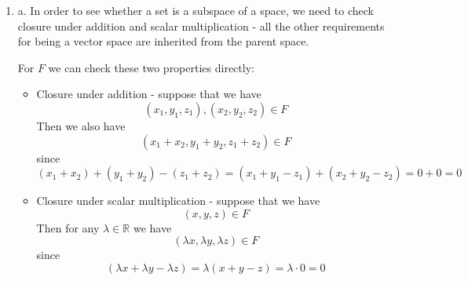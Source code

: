 \documentclass{article}
\newcommand{\chapternumber}{2}
\newenvironment{QandA}{\begin{enumerate}[label=\chapternumber.\arabic*]\bfseries\boldmath}
	{\end{enumerate}}
\newenvironment{answered}{\par\bigskip\normalfont\unboldmath}{}
\begin{document}
\begin{QandA}
\begin{answered}
			c. We note that 
			\[\begin{pmatrix}
				3 \\ 1 \\ 7 \\ 3
			\end{pmatrix}\]
			lies in $U_1$ but that
			\[\begin{pmatrix}
				-3 \\ 2 \\ -5 \\ -1
			\end{pmatrix}\]
			does not. Therefore the dimension of $U_1\cap U_2$ is at least 1 but less than 2, since it does not contain all of $U_2$. Therefore the dimension is exactly 1 and we can write our basis of $U_1\cap U_2$ as
			\[\left\{
			\begin{pmatrix}
				3 \\ 1 \\ 7 \\ 3
			\end{pmatrix}
			\right\}\]
		\end{answered}
		
		\item 
		\begin{answered}
			a. In order to see whether a set is a subspace of a space, we need to check closure under addition and scalar multiplication - all the other requirements for being a vector space are inherited from the parent space.
			
			For $F$ we can check these two properties directly:
			\begin{itemize}
				\item Closure under addition - suppose that we have
				\[(x_1,y_1,z_1),(x_2,y_2,z_2)\in F\]
				Then we also have
				\[(x_1+x_2,y_1+y_2,z_1+z_2)\in F\]
				since
				\[(x_1+x_2) + (y_1+y_2) - (z_1+z_2) = (x_1+y_1-z_1) + (x_2+y_2-z_2) = 0 + 0 = 0\]
				\item Closure under scalar multiplication - suppose that we have
				\[(x,y,z)\in F\]
				Then for any $\lambda\in\mathbb{R}$ we have
				\[(\lambda x,\lambda y,\lambda z)\in F\]
				since 
				\[(\lambda x+\lambda y-\lambda z) = \lambda(x+y-z) = \lambda\cdot0 = 0\]
			\end{itemize}
			

\end{answered}
\end{QandA}
\end{document}
